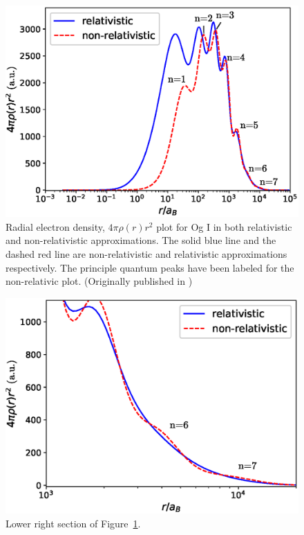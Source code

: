 \documentclass[8pt,a4paper, twoside]{report}
\begin{document}
\begin{figure} 
\includegraphics[scale=0.58]{./figures/Ogplot.eps}
\caption{Radial electron density, $4\pi\rho(r)r^2$ plot for Og I in both relativistic and non-relativistic approximations. The solid blue line and the dashed red line are non-relativistic and relativistic approximations respectively. The principle quantum peaks have been labeled for the non-relativic plot. (Originally published in \cite{LDFOg2018})\label{Og_plot}}
\end{figure}
\begin{figure}
\includegraphics[scale=0.55]{./figures/Ogplot_zoom.eps}
\caption{Lower right section of  Figure~\ref{Og_plot}.\label{Og_plot_zoom}}
\end{figure}
\end{document}
